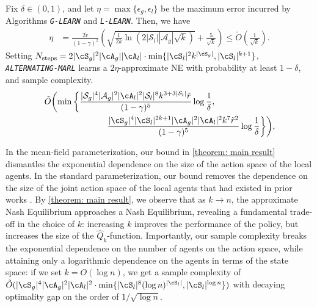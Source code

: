 \begin{theorem} \label{theorem: main result}
Fix $\delta\in(0,1)$, and let $\eta=\max\{\epsilon_g, \epsilon_l\}$ be the maximum error incurred by Algorithms \emph{\texttt{G-LEARN}} and \emph{\texttt{L-LEARN}}. Then, we have \begin{align*}\eta\! &=\!\frac{2\tilde{r}}{(1\!-\!\gamma)^2}\left(\sqrt{\frac{1}{2k} \ln(2|\mathcal{S}_l||\mathcal{A}_g|\sqrt{k})}\!+\!\frac{5}{\sqrt{k}}\right)\!\leq\!\tilde{O}\left(\frac1{\sqrt{k}}\right).
\end{align*}
Setting $N_{\text{steps}} = 2|\cS_g|^2 |\cA_g| |\cA_l| \cdot \min\{|\cS_l|^2 k^{|\cS_g|},  |\cS_l|^{k+1}\}$, \emph{\texttt{ALTERNATING-MARL}} learns a  $2\eta$-approximate NE with probability at least $1-\delta$,  and sample complexity.
\begin{align*}
\tilde{O}\bigg(\!&\min\bigg\{\frac{|\mathcal{S}_g|^4|\mathcal{A}_g|^2 |\cA_l|^2 |\mathcal{S}_l|^8 k^{3 + 3|\mathcal{S}_l| }\tilde{r}}{(1-\gamma)^5}\log \frac1\delta, \\ &\quad\quad\quad\quad\quad\quad \frac{|\cS_g|^4 |\cS_l|^{2k+1} |\cA_g|^2 |\cA_l|^2 k^7 \tilde{r}^2}{(1-\gamma)^5} \log \frac{1}{\delta} \bigg\}\bigg),
\end{align*}
\end{theorem}

\begin{remark}\label{remark: tradeoff in k} In the mean-field parameterization, our bound in \cref{theorem: main result} dismantles the exponential dependence on the size of the action space of the local agents. In the standard parameterization, our bound removes the dependence on the size of the joint action space of the local agents that had existed in prior works \cite{yang2020meanfieldmultiagentreinforcement,li2021permutationinvariantpolicyoptimization, gu2021meanfieldcontrolsqlearningcooperative,gu2022meanfieldmultiagentreinforcementlearning,anand2025meanfield}. By \cref{theorem: main result}, we observe that as $k\to n$, the approximate Nash Equilibrium approaches a Nash Equilibrium, revealing a fundamental trade-off in the choice of $k$: increasing $k$ improves the performance of the policy, but increases the size of the $\hat{Q}_k$-function.  Importantly, our sample complexity breaks the exponential dependence on the number of agents on the action space, while attaining only a logarithmic dependence on the agents in terms of the state space: if we set $k=O(\log n)$, we get a sample complexity of $\tilde{O}(|\cS_g|^4 |\cA_g|^2 |\cA_l|^2 \cdot \min\{|\cS_l|^8 (\log n)^{|\cS_l|}, |\cS_l|^{\log n}\})$ with decaying optimality gap on the order of $1/\sqrt{\log n}$.
\end{remark}


